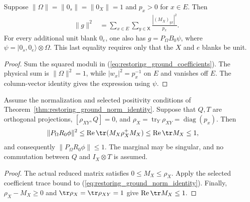 \begin{theorem}
    \label{thm:restoring_ground_norm_identity}
    \leanok
    Suppose $\|\Omega\|=\|0_s\|=\|0_X\|=1$ and $p_x>0$ for $x\in E$.
    Then
    \begin{align}
        \|g\|^2
          &=\sum_{x\in E}\sum_{y\in\mathsf X}
              \frac{|(M_X)_{yx}|^2}{p_x}.
        \label{eq:restoring_ground_norm_identity}
    \end{align}
    For every additional unit blank $0_e$, one also has
    $g=P_\Omega B_0\psi$, where
    $\psi=|0_s,0_e\rangle\otimes\Omega$.
    This last equality requires only that the $X$ and $e$ blanks be unit.
\end{theorem}
\begin{proof}\leanok
    Sum the squared moduli in (\ref{eq:restoring_ground_coefficients}).
    The physical sum is $\|\Omega\|^2=1$, while
    $|w_x|^2=p_x^{-1}$ on $E$ and vanishes off $E$.
    The column-vector identity gives the expression using $\psi$.
\end{proof}

\begin{theorem}
    \label{thm:restoring_ground_bound}
    \leanok
    Assume the normalization and selected positivity conditions of
    Theorem~\ref{thm:restoring_ground_norm_identity}. Suppose that $Q,T$
    are orthogonal projections, $[\rho_{XY},Q]=0$, and
    $\rho_X=\operatorname{tr}_Y\rho_{XY}=\operatorname{diag}(p_x)$.
    Then
    \begin{align}
        \|P_\Omega R_0\phi\|^2
          &\le\operatorname{Re}\tr(M_X\rho_X^+M_X)
           \le\operatorname{Re}\tr M_X\le1,
        \label{eq:restoring_ground_bound}
    \end{align}
    and consequently $\|P_\Omega R_0\phi\|\le1$.
    The marginal may be singular, and no commutation between $Q$ and
    $I_X\otimes T$ is assumed.
\end{theorem}
\begin{proof}\leanok
    The actual reduced matrix satisfies $0\le M_X\le\rho_X$.
    Apply the selected coefficient trace bound to
    (\ref{eq:restoring_ground_norm_identity}). Finally,
    $\rho_X-M_X\ge0$ and $\tr\rho_X=\tr\rho_{XY}=1$ give
    $\operatorname{Re}\tr M_X\le1$.
\end{proof}

